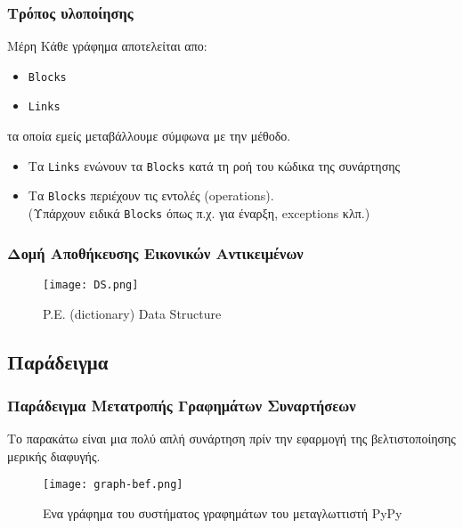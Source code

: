 \documentclass[greek]{beamer}
\begin{document}
\begin{frame}
\frametitle{Τρόπος υλοποίησης}

\begin{block}{Μέρη}
Κάθε γράφημα αποτελείται απο:
\begin{itemize}
	\item \texttt{\textlatin{Blocks}}
	\item \texttt{\textlatin{Links}}
\end{itemize}
τα οποία εμείς μεταβάλλουμε σύμφωνα με την μέθοδο.
\end{block}

\begin{itemize}
	\item Τα \texttt{\textlatin{Links}} ενώνουν τα \texttt{\textlatin{Blocks}} κατά τη
	ροή του κώδικα της συνάρτησης
	\item Τα \texttt{\textlatin{Blocks}} περιέχουν τις εντολές (\textlatin{operations}).\\
    (Υπάρχουν ειδικά \texttt{\textlatin{Blocks}} όπως π.χ. για έναρξη, \textlatin{exceptions} κλπ.)
\end{itemize}

\end{frame}


\begin{frame}
\frametitle{Δομή Αποθήκευσης Εικονικών Αντικειμένων}

\begin{figure}
\caption{\textlatin{P.E. (dictionary) Data Structure}}
\texttt{[image: DS.png]}
\end{figure}

\end{frame}


\subsection{Παράδειγμα}

\begin{frame}
\frametitle{Παράδειγμα Μετατροπής Γραφημάτων Συναρτήσεων}
Το παρακάτω είναι μια πολύ απλή συνάρτηση πρίν την εφαρμογή της
βελτιστοποίησης μερικής διαφυγής.
\begin{figure}
\caption{Ενα γράφημα του συστήματος γραφημάτων του μεταγλωττιστή
\textlatin{PyPy}}
\texttt{[image: graph-bef.png]}
\end{figure}
\end{frame}
\end{document}
